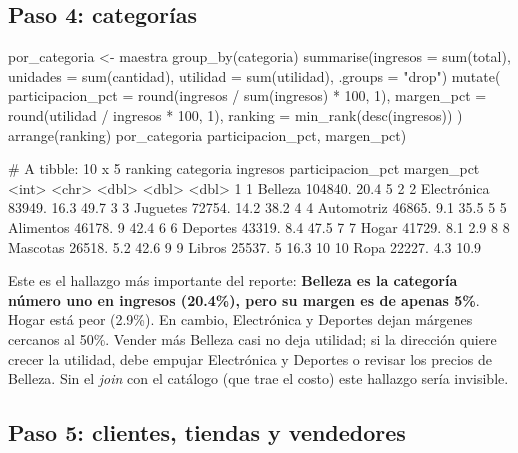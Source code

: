 \subsection{Paso 4: categorías}

\begin{rcode}[title=Reporte mensual: categorías]
por_categoria <- maestra %
  group_by(categoria) %
  summarise(ingresos = sum(total), unidades = sum(cantidad),
            utilidad = sum(utilidad), .groups = "drop") %
  mutate(
    participacion_pct = round(ingresos / sum(ingresos) * 100, 1),
    margen_pct        = round(utilidad / ingresos * 100, 1),
    ranking           = min_rank(desc(ingresos))
  ) %
  arrange(ranking)
por_categoria %
                         participacion_pct, margen_pct)
\end{rcode}
\begin{rsalida}
# A tibble: 10 x 5
   ranking categoria   ingresos participacion_pct margen_pct
     <int> <chr>          <dbl>             <dbl>      <dbl>
 1       1 Belleza      104840.              20.4        5  
 2       2 Electrónica   83949.              16.3       49.7
 3       3 Juguetes      72754.              14.2       38.2
 4       4 Automotriz    46865.               9.1       35.5
 5       5 Alimentos     46178.               9         42.4
 6       6 Deportes      43319.               8.4       47.5
 7       7 Hogar         41729.               8.1        2.9
 8       8 Mascotas      26518.               5.2       42.6
 9       9 Libros        25537.               5         16.3
10      10 Ropa          22227.               4.3       10.9
\end{rsalida}

Este es el hallazgo más importante del reporte: \textbf{Belleza es la
categoría número uno en ingresos (20.4\%), pero su margen es de apenas
5\%}. Hogar está peor (2.9\%). En cambio, Electrónica y Deportes dejan
márgenes cercanos al 50\%. Vender más Belleza casi no deja utilidad; si la
dirección quiere crecer la utilidad, debe empujar Electrónica y Deportes o
revisar los precios de Belleza. Sin el \emph{join} con el catálogo (que trae
el costo) este hallazgo sería invisible.

\subsection{Paso 5: clientes, tiendas y vendedores}

